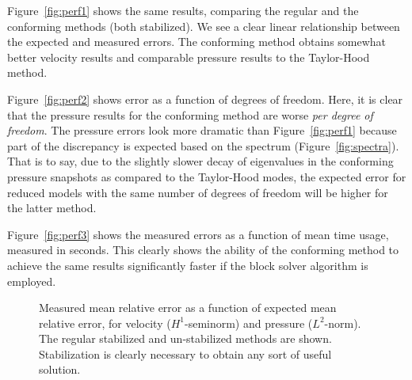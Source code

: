 \documentclass[onecolumn, twoside, a4paper, 11pt]{article}
\begin{document}
Figure~\ref{fig:perf1} shows the same results, comparing the regular and the conforming methods
(both stabilized). We see a clear linear relationship between the expected and measured errors. The
conforming method obtains somewhat better velocity results and comparable pressure results to the
Taylor-Hood method.

Figure~\ref{fig:perf2} shows error as a function of degrees of freedom. Here, it is clear that the
pressure results for the conforming method are worse \emph{per degree of freedom}. The pressure
errors look more dramatic than Figure~\ref{fig:perf1} because part of the discrepancy is expected
based on the spectrum (Figure~\ref{fig:spectra}). That is to say, due to the slightly slower decay
of eigenvalues in the conforming pressure snapshots as compared to the Taylor-Hood modes, the
expected error for reduced models with the same number of degrees of freedom will be higher for the
latter method.

Figure~\ref{fig:perf3} shows the measured errors as a function of mean time usage, measured in
seconds. This clearly shows the ability of the conforming method to achieve the same results
significantly faster if the block solver algorithm is employed.

\begin{figure}
  \caption{
    Measured mean relative error as a function of expected mean relative error,
    for velocity ($H^1$-seminorm) and pressure ($L^2$-norm). The regular
    stabilized and un-stabilized methods are shown. Stabilization is clearly
    necessary to obtain any sort of useful solution.
  }
  \label{fig:perf1-unstab}
\end{figure}
\end{document}
